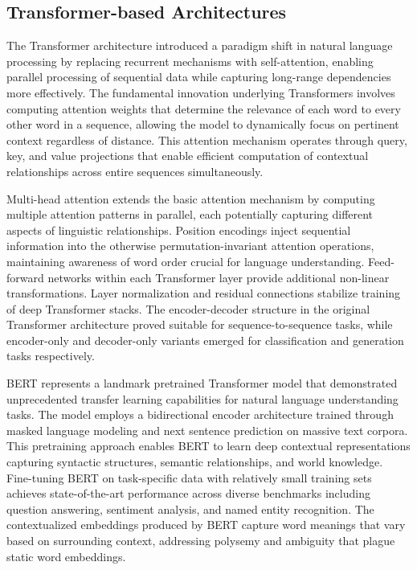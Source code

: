 \documentclass[12pt,a4paper]{report}
\begin{document}
\subsection{Transformer-based Architectures}

The Transformer architecture introduced a paradigm shift in natural language processing by replacing recurrent mechanisms with self-attention, enabling parallel processing of sequential data while capturing long-range dependencies more effectively. The fundamental innovation underlying Transformers involves computing attention weights that determine the relevance of each word to every other word in a sequence, allowing the model to dynamically focus on pertinent context regardless of distance. This attention mechanism operates through query, key, and value projections that enable efficient computation of contextual relationships across entire sequences simultaneously.

Multi-head attention extends the basic attention mechanism by computing multiple attention patterns in parallel, each potentially capturing different aspects of linguistic relationships. Position encodings inject sequential information into the otherwise permutation-invariant attention operations, maintaining awareness of word order crucial for language understanding. Feed-forward networks within each Transformer layer provide additional non-linear transformations. Layer normalization and residual connections stabilize training of deep Transformer stacks. The encoder-decoder structure in the original Transformer architecture proved suitable for sequence-to-sequence tasks, while encoder-only and decoder-only variants emerged for classification and generation tasks respectively.

BERT represents a landmark pretrained Transformer model that demonstrated unprecedented transfer learning capabilities for natural language understanding tasks. The model employs a bidirectional encoder architecture trained through masked language modeling and next sentence prediction on massive text corpora. This pretraining approach enables BERT to learn deep contextual representations capturing syntactic structures, semantic relationships, and world knowledge. Fine-tuning BERT on task-specific data with relatively small training sets achieves state-of-the-art performance across diverse benchmarks including question answering, sentiment analysis, and named entity recognition. The contextualized embeddings produced by BERT capture word meanings that vary based on surrounding context, addressing polysemy and ambiguity that plague static word embeddings.
\end{document}
